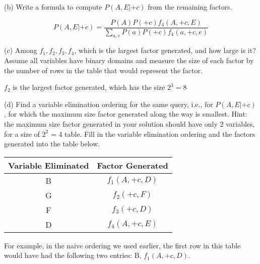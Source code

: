 \documentclass[11pt, answers]{exam}
\begin{document}
\begin{questions}
(b) Write a formula to compute $P(A,E|+c)$ from the remaining factors.

	\begin{solution}
	$$P(A,E|+c) = \frac{P(A)P(+c)f_4(A,+c,E)}{\sum_{a,e} P(a)P(+c)f_4(a,+c,e)}$$
	\end{solution}
	
(c) Among $f_1,f_2,f_3,f_4$, which is the largest factor generated, and how large is it? Assume all variables have binary domains and measure the size of each factor by the number of rows in the table that would represent the factor.

	\begin{solution}
	$f_2$ is the largest factor generated, which has the size $2^3 = 8$
	\end{solution}

(d) Find a variable elimination ordering for the same query, i.e., for $P(A,E|+c)$, for which the maximum size factor generated along the way is smallest. Hint: the maximum size factor generated in your solution should have only 2 variables, for a size of $2^2$ = 4 table. Fill in the variable elimination ordering and the factors generated into the table below.

\begin{table}[h!]
\centering
\begin{tabular}{|c|c|}
\hline
Variable Eliminated & Factor Generated \\ \hline
   B                & $f_1(A,+c,D)$    \\ \hline
   G                & $f_2(+c,F)$      \\ \hline
   F                & $f_3(+c,D)$            \\ \hline
   D                & $f_4(A,+c,E)$             \\ \hline
\end{tabular}
\end{table}

For example, in the naive ordering we used earlier, the first row in this table would have had the following two entries: B, $f_1(A,+c,D)$.
\end{questions}
\end{document}
